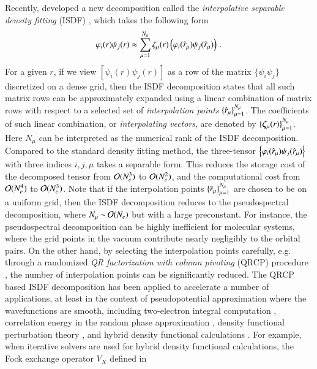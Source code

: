 Recently, \citet{JCP_302_329_2015_ISDF} developed a new decomposition called the
\emph{interpolative separable density fitting} (ISDF) , which takes the
following form
\begin{equation}\label{eqn:isdfformat}
  \varphi_{i}(r)  \psi_{j}(r)\approx \sum_{\mu=1}^{N_{\mu}}\zeta_{\mu}(r) \left(
  \varphi_{i}(\hat{r}_\mu)\psi_{j}(\hat{r}_\mu)\right)\,.
\end{equation}
For a given $r$, if we view $[\psi_{i}(r)\psi_{j}(r)]$ as a row of the matrix $
\{\psi_{i}\psi_{j}\}$ discretized on a dense grid, then the ISDF decomposition
states that all such matrix rows can be approximately expanded using a linear
combination of matrix rows with respect to a selected set of 
\textit{interpolation points} $\{\hat{r}_\mu\}_{\mu=1}^{N_{\mu}}$. The
coefficients of such linear combination, or \textit{interpolating vectors}, are
denoted by $\{\bm{\zeta}_{\mu}(r)\}_{\mu=1}^{N_{\mu}}$. Here $N_{\mu}$ can be
interpreted as the numerical rank of the ISDF decomposition. Compared to the
standard density fitting method, the three-tensor $\left\{\varphi_{i}
(\hat{r}_\mu)\psi_{j}(\hat{r}_\mu)\right\}$ with three indices $i, j, \mu$ takes a
separable form. This reduces the storage cost of the decomposed tensor from
$\mathcal{O}(N_{e}^3)$ to $\mathcal{O}(N_{e}^2)$, and the computational cost from $\mathcal{O}(N_
{e}^{4})$ to $\mathcal{O}(N_{e}^3)$. Note that if the interpolation points $
\{\hat{r}_\mu\}_{\mu=1}^{N_{\mu}}$ are chosen to be on a uniform grid, then the
ISDF decomposition reduces to the pseudospectral decomposition, where $N_
{\mu}\mathbin{\sim}\mathcal{O}(N_{e})$ but with a large preconstant. For instance, the
pseudospectral decomposition can be highly inefficient for molecular systems,
where the grid points in the vacuum contribute nearly negligibly to the orbital
pairs. On the other hand, by selecting the interpolation points carefully, e.g.
through a randomized \emph{QR factorization with column pivoting} (QRCP)
procedure \cite{GolubVan2013}, the number of interpolation points can be
significantly reduced. The QRCP based ISDF decomposition has been applied to
accelerate a number of applications, at least in the context of pseudopotential
approximation where the wavefunctions are smooth, including two\hyp{}electron
integral computation \cite{JCP_302_329_2015_ISDF}, correlation energy in the
random phase approximation \cite{LuThicke2017}, density functional perturbation
theory \cite{LinXuYing2017}, and hybrid density functional calculations 
\cite{JCTC_2017_ISDF}. For example, when iterative solvers are used for hybrid
density functional calculations, the Fock exchange operator $V_{X}$ defined in
